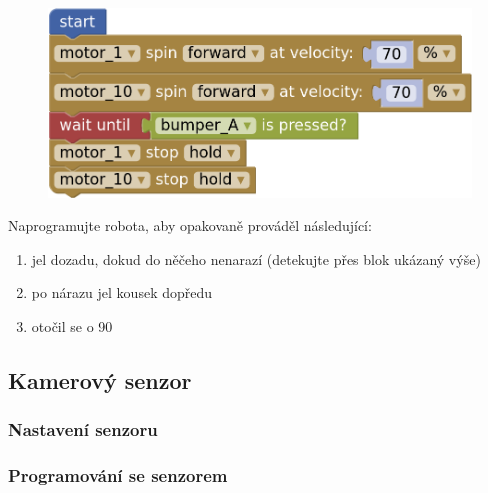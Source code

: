 \documentclass[../main.tex]{subfiles}
\begin{document}
	\begin{figure}
		\centering
		\begin{minipage}{0.5\textwidth}
			\includegraphics[width=\linewidth]{Images/02/sol7.png}
		\end{minipage}
	\end{figure}

	\begin{question}
		Naprogramujte robota, aby opakovaně prováděl následující:
		\begin{enumerate}
			\item jel dozadu, dokud do něčeho nenarazí (detekujte přes blok ukázaný výše)
			\item po nárazu jel kousek dopředu
			\item otočil se o 90\degree
		\end{enumerate}
	\end{question}

	\subsection{Kamerový senzor}

	\subsubsection{Nastavení senzoru}

	\subsubsection{Programování se senzorem}
\end{document}
